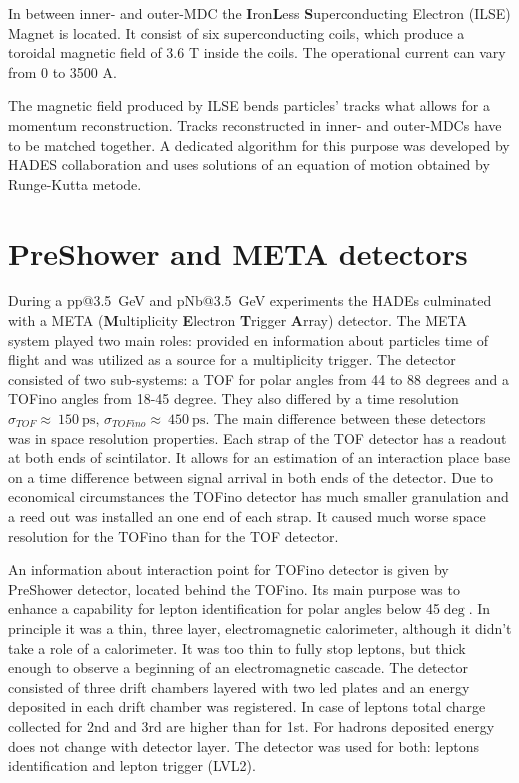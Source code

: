 In between inner- and outer-MDC the \textbf{I}ron\textbf{L}ess \textbf{S}uperconducting Electron (ILSE) Magnet is located. It consist of six superconducting coils, which produce a toroidal magnetic field of 3.6 T inside the coils. The operational current can vary from 0 to 3500 A. 

The magnetic field produced by ILSE bends particles' tracks what allows for a momentum reconstruction. Tracks reconstructed in inner- and outer-MDCs have to be matched together. A dedicated algorithm for this purpose was developed by HADES collaboration and uses solutions of an equation of motion obtained by Runge-Kutta metode.

\section{PreShower and META detectors}
During a pp@3.5~GeV and pNb@3.5~GeV experiments the HADEs culminated with a META (\textbf{M}ultiplicity \textbf{E}lectron \textbf{T}rigger \textbf{A}rray) detector. The META system played two main roles: provided en information about particles time of flight and was utilized as a source for a multiplicity trigger. The detector consisted of two sub-systems: a TOF for polar angles from 44 to 88 degrees and a TOFino angles from 18-45 degree. They also differed by a time resolution $\sigma_{TOF}\approx~150~\mathrm{ps}$, $\sigma_{TOFino}\approx~450~\mathrm{ps}$. The main difference between these detectors was in space resolution properties. Each strap of the TOF detector has a readout at both ends of scintilator. It allows for an estimation of an interaction place base on a time difference between signal arrival in both ends of the detector. Due to economical circumstances the TOFino detector has much smaller granulation and a reed out was installed an one end of each strap. It caused much worse space resolution for the TOFino than for the TOF detector.

An information about interaction point for TOFino detector is given by PreShower detector, located behind the TOFino. Its main purpose was to enhance a capability for lepton identification for polar angles below 45$\deg$. In principle it was a thin, three layer, electromagnetic calorimeter, although it didn't take a role of a calorimeter. It was too thin to fully stop leptons, but thick enough to observe a beginning of an electromagnetic cascade. The detector consisted of three drift chambers layered with two led plates and an energy deposited in each drift chamber was registered. In case of leptons total charge collected for 2nd and 3rd are higher than for 1st. For hadrons deposited energy does not change with detector layer. The detector was used for both: leptons identification and lepton trigger (LVL2).

